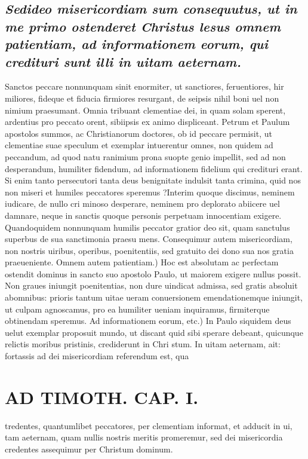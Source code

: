 \documentclass{article}
\begin{document}
\begin{pages}
\subsection*{\textit{Sedideo misericordiam sum consequutus, ut in me primo ostenderet Christus lesus omnem patientiam, ad informationem eorum, qui credituri sunt illi in uitam aeternam. }}\pstart Sanctos peccare nonnunquam sinit enormiter, ut sanctiores, feruentiores, hir miliores, fideque et fiducia firmiores resurgant, de seipsis nihil boni uel non nimium praesumant. Omnia tribuant clementiae dei, in quam solam sperent, ardentius pro peccato orent, sibiipsis ex animo displiceant. Petrum et Paulum apostolos summos, ac Christianorum doctores, ob id peccare permisit, ut clementiae suae speculum et exemplar intuerentur omnes, non quidem ad peccandum, ad quod natu ranimium prona suopte genio impellit, sed ad non desperandum, humiliter fidendum, ad informationem fidelium qui credituri erant. Si enim tanto persecutori tanta deus benignitate indulsit tanta crimina, quid nos non miseri et humiles peccatores speremus ?Interim quoque discimus, neminem iudicare, de nullo cri minoso desperare, neminem pro deplorato abiicere uel damnare, neque in sanctis quoque personis perpetuam innocentiam exigere. Quandoquidem nonnunquam humilis peccator gratior deo sit, quam sanctulus superbus de sua sanctimonia praesu mens. Consequimur autem misericordiam, non nostris uiribus, operibus, poenitentiis, sed gratuito dei dono sua nos gratia praeueniente. Omnem autem patientiam.) Hoc est absolutam ac perfectam ostendit dominus in sancto suo apostolo Paulo, ut maiorem exigere nullus possit. Non graues iniungit poenitentias, non dure uindicat admissa, sed gratis absoluit abomnibus: prioris tantum uitae ueram conuersionem emendationemque iniungit, ut culpam agnoscamus, pro ea humiliter ueniam inquiramus, firmiterque obtinendam speremus. Ad informationem eorum, etc.) In Paulo siquidem deus uelut exemplar proposuit mundo, ut discant quid sibi sperare debeant, quicunque relictis moribus pristinis, crediderunt in Chri stum. In uitam aeternam, ait: fortassis ad dei misericordiam referendum est, qua  \pend
\section*{AD TIMOTH. CAP. I. }
\marginpar{[ p.477 ]}\pstart tredentes, quantumlibet peccatores, per clementiam informat, et adducit in ui, tam aeternam, quam nullis nostris meritis promeremur, sed dei misericordia credentes assequimur per Christum dominum.  \pend
{}
{}

\end{pages}
\end{document}
